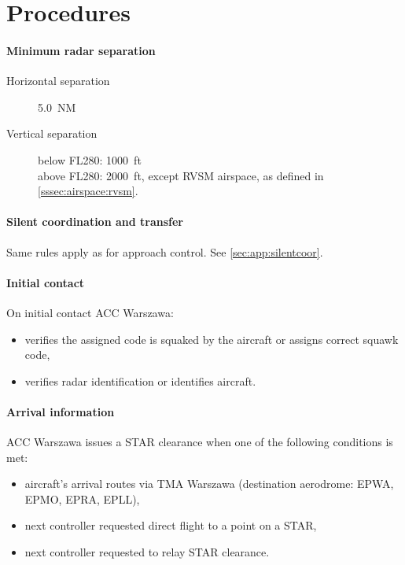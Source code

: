 
\chapter{Procedures}
\label{chap:acc:procedures}

\subsubsection{Minimum radar separation}

\begin{description}
\item[Horizontal separation] 5.0~NM
\item[Vertical separation]\parbox[t]{0.8\textwidth}{ below FL280: 1000~ft\\
above FL280: 2000~ft, except RVSM airspace, as defined in \cref{sssec:airspace:rvsm}.}
\end{description}

\subsubsection{Silent coordination and transfer}

Same rules apply as for approach control. See \cref{sec:app:silentcoor}.

\subsubsection{Initial contact}

On initial contact ACC Warszawa:
\begin{itemize}
\item verifies the assigned code is squaked by the aircraft or assigns correct
  squawk code,
\item verifies radar identification or identifies aircraft.
\end{itemize}

\subsubsection{Arrival information}

ACC Warszawa issues a STAR clearance when one of the following conditions is
met:

\begin{itemize}
\item aircraft's arrival routes via TMA Warszawa (destination aerodrome: EPWA,
  EPMO, EPRA, EPLL),
\item next controller requested direct flight to a point on a STAR,
\item next controller requested to relay STAR clearance.
\end{itemize}

